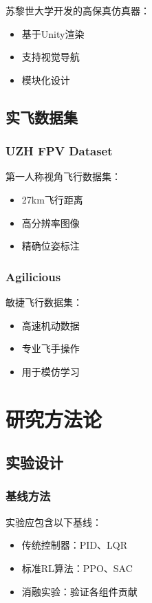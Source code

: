 苏黎世大学开发的高保真仿真器：
\begin{itemize}
    \item 基于Unity渲染
    \item 支持视觉导航
    \item 模块化设计
\end{itemize}

\subsection{实飞数据集}

\subsubsection{UZH FPV Dataset}

第一人称视角飞行数据集：
\begin{itemize}
    \item 27km飞行距离
    \item 高分辨率图像
    \item 精确位姿标注
\end{itemize}

\subsubsection{Agilicious}

敏捷飞行数据集：
\begin{itemize}
    \item 高速机动数据
    \item 专业飞手操作
    \item 用于模仿学习
\end{itemize}

\section{研究方法论}\label{sec:methodology}

\subsection{实验设计}

\subsubsection{基线方法}

实验应包含以下基线：
\begin{itemize}
    \item 传统控制器：PID、LQR
    \item 标准RL算法：PPO、SAC
    \item 消融实验：验证各组件贡献
\end{itemize}

